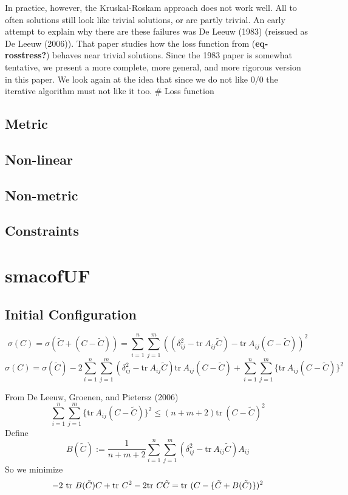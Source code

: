 \documentclass[
  12pt,
]{article}
\begin{document}
In practice, however, the Kruskal-Roskam approach does not work well. All to often solutions still look like trivial solutions, or are partly trivial. An early attempt to explain why there are these failures
was De Leeuw (1983) (reissued as De Leeuw (2006)). That paper studies how the loss function from (\textbf{eq-rosstress?}) behaves near trivial solutions. Since the 1983 paper is somewhat tentative, we present a more complete, more general, and more rigorous version in this paper. We look again at the idea that since we do not like \(0/0\) the iterative algorithm must not like it too.
\# Loss function

\subsection{Metric}\label{metric}

\subsection{Non-linear}\label{non-linear}

\subsection{Non-metric}\label{non-metric}

\subsection{Constraints}\label{constraints}

\section{smacofUF}\label{smacofuf}

\subsection{Initial Configuration}\label{initial-configuration}

\[
\sigma(C)=\sigma(\tilde C+(C-\tilde C))=\sum_{i=1}^n\sum_{j=1}^m((\delta_{ij}^2-\text{tr}\ A_{ij}\tilde C)-\text{tr}\ A_{ij}(C-\tilde C))^2
\]
\[
\sigma(C)=\sigma(\tilde C)-2\sum_{i=1}^n\sum_{j=1}^m(\delta_{ij}^2-\text{tr}\ A_{ij}\tilde C)\text{tr}\ A_{ij}(C-\tilde C)+\sum_{i=1}^n\sum_{j=1}^m\{\text{tr}\ A_{ij}(C-\tilde C)\}^2
\]

From De Leeuw, Groenen, and Pietersz (2006)
\[
\sum_{i=1}^n\sum_{j=1}^m\{\text{tr}\ A_{ij}(C-\tilde C)\}^2\leq (n+m+2)\text{tr}\ (C-\tilde C)^2
\]
Define
\[
B(\tilde C):=\frac{1}{n+m+2}\sum_{i=1}^n\sum_{j=1}^m(\delta_{ij}^2-\text{tr}\ A_{ij}\tilde C)A_{ij}
\]
So we minimize
\[
-2\ \text{tr}\ B(\tilde C)C+\text{tr}\ C^2-2\text{tr}\ C\tilde C=\\
\text{tr}\ (C-\{\tilde C + B(\tilde C)\})^2
\]
\end{document}

